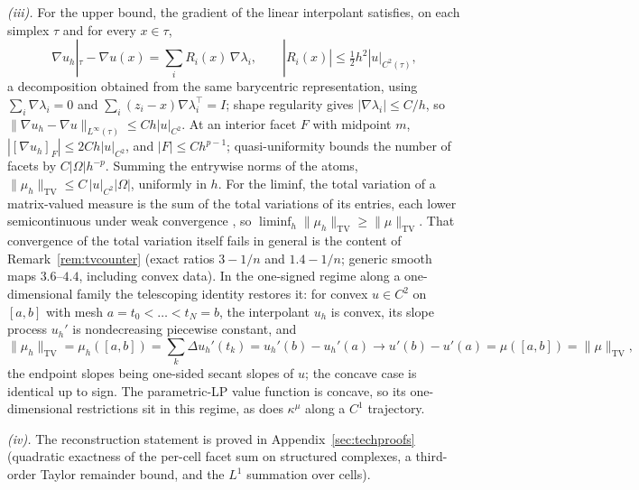 \documentclass[11pt,a4paper]{article}
\theoremstyle{plain}
\theoremstyle{definition}
\theoremstyle{remark}
\newcommand{\kmu}{\kappa^{\mu}}
\newcommand{\TV}{\mathrm{TV}}
\begin{document}
\emph{(iii).} For the upper bound, the gradient of the linear
interpolant satisfies, on each simplex $\tau$ and for every
$x \in \tau$,
\[
\nabla u_h|_{\tau} - \nabla u(x) = \sum_i R_i(x)\, \nabla\lambda_i,
\qquad |R_i(x)| \le \tfrac12 h^{2} |u|_{C^{2}(\tau)},
\]
a decomposition obtained from the same barycentric representation,
using $\sum_i \nabla\lambda_i = 0$ and $\sum_i (z_i -
x)\nabla\lambda_i^{\top} = I$; shape regularity gives
$|\nabla\lambda_i| \le C/h$, so $\|\nabla u_h - \nabla
u\|_{L^\infty(\tau)} \le C h |u|_{C^{2}}$. At an interior facet $F$
with midpoint $m$, $|[\nabla u_h]_F| \le 2Ch|u|_{C^{2}}$, and $|F|
\le Ch^{p-1}$; quasi-uniformity bounds the number of facets by
$C|\Omega| h^{-p}$. Summing the entrywise norms of the atoms,
$\|\mu_h\|_{\TV} \le C\,|u|_{C^{2}}|\Omega|$, uniformly in $h$. For
the liminf, the total variation of a matrix-valued measure is the
sum of the total variations of its entries, each lower semicontinuous
under weak convergence \citep{billingsley1999}, so
$\liminf_h \|\mu_h\|_{\TV} \ge \|\mu\|_{\TV}$. That convergence of
the total variation itself fails in general is the content of
Remark~\ref{rem:tvcounter} (exact ratios $3 - 1/n$ and $1.4 - 1/n$;
generic smooth maps $3.6$--$4.4$, including convex data). In the
one-signed regime along a one-dimensional family the telescoping
identity restores it: for convex $u \in C^{2}$ on $[a,b]$ with mesh
$a = t_0 < \dots < t_N = b$, the interpolant $u_h$ is convex, its
slope process $u_h'$ is nondecreasing piecewise constant, and
\[
\|\mu_h\|_{\TV} = \mu_h([a,b]) = \sum_{k} \Delta u_h'(t_k)
= u_h'(b) - u_h'(a) \to u'(b) - u'(a) = \mu([a,b]) = \|\mu\|_{\TV},
\]
the endpoint slopes being one-sided secant slopes of $u$; the
concave case is identical up to sign. The parametric-LP value
function is concave, so its one-dimensional restrictions sit in this
regime, as does $\kmu$ along a $C^{1}$ trajectory.

\emph{(iv).} The reconstruction statement is proved in
Appendix~\ref{sec:techproofs} (quadratic exactness of the per-cell
facet sum on structured complexes, a third-order Taylor remainder
bound, and the $L^{1}$ summation over cells).
\end{document}
